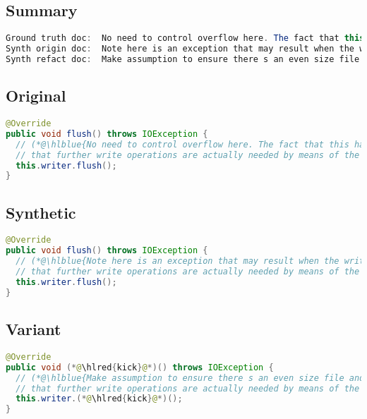 \documentclass[11pt]{article}
\DeclareRobustCommand{\hlred}[1]{{\sethlcolor{YellowOrange}\hl{#1}}}
\DeclareRobustCommand{\hlblue}[1]{{\sethlcolor{SeaGreen}\hl{#1}}}
\DeclareRobustCommand{\hlblue}[1]{{\sethlcolor{SkyBlue}\hl{#1}}}
\begin{document}
\subsection{Summary}

\begin{lstlisting}[language=java]
Ground truth doc:  No need to control overflow here. The fact that this has overflow will be used as a flag to determine
Synth origin doc:  Note here is an exception that may result when the writer checks whether there exist problems or otherwise to
Synth refact doc:  Make assumption to ensure there s an even size file and if required then it seems the user will
\end{lstlisting}

\subsection{Original}
\begin{lstlisting}[language=java]
@Override
public void flush() throws IOException {
  // (*@\hlblue{No need to control overflow here. The fact that this has overflow will be used as a flag to determine}@*)
  // that further write operations are actually needed by means of the isOverflown() method.
  this.writer.flush();
}
\end{lstlisting}
\subsection{Synthetic}

\begin{lstlisting}[language=java]
@Override
public void flush() throws IOException {
  // (*@\hlblue{Note here is an exception that may result when the writer checks whether there exist problems or otherwise to}@*)
  // that further write operations are actually needed by means of the isOverflown() method.
  this.writer.flush();
}
\end{lstlisting}

\subsection{Variant}

\begin{lstlisting}[language=java]
@Override
public void (*@\hlred{kick}@*)() throws IOException {
  // (*@\hlblue{Make assumption to ensure there s an even size file and if required then it seems the user will}@*)
  // that further write operations are actually needed by means of the isOverflown() method.
  this.writer.(*@\hlred{kick}@*)();
}
\end{lstlisting}
\end{document}
